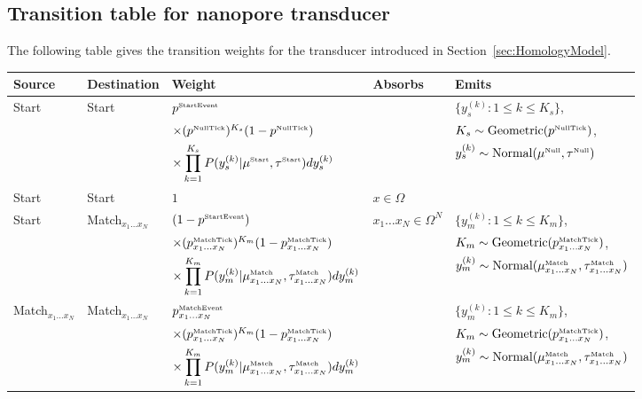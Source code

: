\documentclass[10pt]{article}
\newcommand{\secref}[1]{Section~\ref{sec:#1}}
\newcommand{\seclabel}[1]{\label{sec:#1}}
\begin{document}

\subsection{Transition table for nanopore transducer}
\seclabel{TransducerTransitionTable}

The following table gives the transition weights for the transducer introduced in \secref{HomologyModel}.

\small

\noindent
\begin{tabular}{lllll}
\hline
Source & Destination & Weight & Absorbs & Emits \\
\hline
Start & Start & $p^{\mbox{\tiny StartEvent}}$ & & $\{ y_s^{(k)}: 1 \leq k \leq K_s \}$, \\
& & $\times (p^{\mbox{\tiny NullTick}})^{K_s} (1-p^{\mbox{\tiny NullTick}})$ & & $K_s \sim \mbox{Geometric}(p^{\mbox{\tiny NullTick}})$, \\
& & $\times \displaystyle \prod_{k=1}^{K_s} P(y^{(k)}_s|\mu^{\mbox{\tiny Start}},\tau^{\mbox{\tiny Start}}) dy^{(k)}_s$ & & $y_s^{(k)} \sim \mbox{Normal}(\mu^{\mbox{\tiny Null}},\tau^{\mbox{\tiny Null}})$ \\
Start & Start & $1$ & $x \in \Omega$ & \\
Start & Match${}_{x_1 \ldots x_N}$ & $(1 - p^{\mbox{\tiny StartEvent}})$ & $x_1 \ldots x_N \in \Omega^N$ & $\{ y_m^{(k)}: 1 \leq k \leq K_m \}$, \\
& & $\times (p^{\mbox{\tiny MatchTick}}_{x_1\ldots x_N})^{K_m} (1-p^{\mbox{\tiny MatchTick}}_{x_1\ldots x_N})$ & & $K_m \sim \mbox{Geometric}(p^{\mbox{\tiny MatchTick}}_{x_1\ldots x_N})$, \\
& & $\times \displaystyle \prod_{k=1}^{K_m} P(y^{(k)}_m|\mu^{\mbox{\tiny Match}}_{x_1\ldots x_N},\tau^{\mbox{\tiny Match}}_{x_1\ldots x_N}) dy^{(k)}_m$ & & $y_m^{(k)} \sim \mbox{Normal}(\mu^{\mbox{\tiny Match}}_{x_1\ldots x_N},\tau^{\mbox{\tiny Match}}_{x_1\ldots x_N})$ \\
Match${}_{x_1 \ldots x_N}$ & Match${}_{x_1 \ldots x_N}$ & ${p^{\mbox{\tiny MatchEvent}}_{x_1\ldots x_N}}$ & & $\{ y_m^{(k)}: 1 \leq k \leq K_m \}$, \\
& & $\times (p^{\mbox{\tiny MatchTick}}_{x_1\ldots x_N})^{K_m} (1-p^{\mbox{\tiny MatchTick}}_{x_1\ldots x_N} )$ & & $K_m \sim \mbox{Geometric}(p^{\mbox{\tiny MatchTick}}_{x_1\ldots x_N})$, \\
& & $\times \displaystyle \prod_{k=1}^{K_m} P(y^{(k)}_m|\mu^{\mbox{\tiny Match}}_{x_1\ldots x_N},\tau^{\mbox{\tiny Match}}_{x_1\ldots x_N}) dy^{(k)}_m$ & & $y_m^{(k)} \sim \mbox{Normal}(\mu^{\mbox{\tiny Match}}_{x_1\ldots x_N},\tau^{\mbox{\tiny Match}}_{x_1\ldots x_N})$ \\

\end{tabular}
\end{document}
